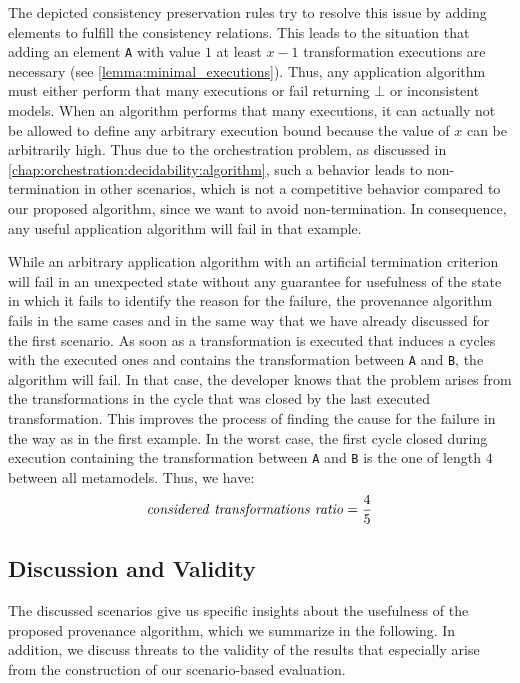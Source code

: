 The depicted consistency preservation rules try to resolve this issue by adding elements to fulfill the consistency relations.
This leads to the situation that adding an element \texttt{A} with value $1$ at least $x-1$ transformation executions are necessary (see \autoref{lemma:minimal_executions}).
Thus, any application algorithm must either perform that many executions or fail returning $\bot$ or inconsistent models.
When an algorithm performs that many executions, it can actually not be allowed to define any arbitrary execution bound because the value of $x$ can be arbitrarily high.
Thus due to the orchestration problem, as discussed in \autoref{chap:orchestration:decidability:algorithm}, such a behavior leads to non-termination in other scenarios, which is not a competitive behavior compared to our proposed algorithm, since we want to avoid non-termination.
In consequence, any useful application algorithm will fail in that example.

While an arbitrary application algorithm with an artificial termination criterion will fail in an unexpected state without any guarantee for usefulness of the state in which it fails to identify the reason for the failure, the provenance algorithm fails in the same cases and in the same way that we have already discussed for the first scenario.
As soon as a transformation is executed that induces a cycles with the executed ones and contains the transformation between \texttt{A} and \texttt{B}, the algorithm will fail.
In that case, the developer knows that the problem arises from the transformations in the cycle that was closed by the last executed transformation.
This improves the process of finding the cause for the failure in the way as in the first example.
In the worst case, the first cycle closed during execution containing the transformation between \texttt{A} and \texttt{B} is the one of length $4$ between all metamodels.
Thus, we have:
\begin{align*}
    \mathit{considered\ transformations\ ratio} = \frac{4}{5}
\end{align*}


\subsection{Discussion and Validity}
\label{chap:correctness_evaluation:orchestration:discussion}

The discussed scenarios give us specific insights about the usefulness of the proposed provenance algorithm, which we summarize in the following.
In addition, we discuss threats to the validity of the results that especially arise from the construction of our scenario-based evaluation.

